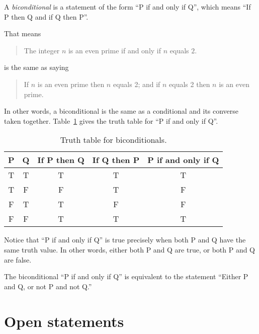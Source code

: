 \documentclass{tufte-book}
\begin{document}
\begin{definition}
  A \emph{biconditional} is a statement of the form ``P if and only if Q'', which means ``If P then Q and if Q then P''.
\end{definition}

That means
\begin{quote}
  The integer $n$ is an even prime if and only if $n$ equals $2$.
\end{quote}
is the same as saying
\begin{quote}
  If $n$ is an even prime then $n$ equals 2; and if $n$ equals 2 then $n$ is an even prime.
\end{quote}
In other words, a biconditional is the same as a conditional and its converse taken together. Table~\ref{tab:truth-table-iff} gives the truth table for ``P if and only if Q''.

\begin{table}
  \centering
  \begin{tabular}{ccccc}
    \toprule
    P & Q & If P then Q & If Q then P & P if and only if Q \\ \midrule
    T & T & T & T & T\\
    T & F & F & T & F\\
    F & T & T & F & F\\
    F & F & T & T & T\\ \bottomrule
  \end{tabular}
  \caption{Truth table for biconditionals.}
  \label{tab:truth-table-iff}
\end{table}

Notice that ``P if and only if Q'' is true precisely when both P and Q have the same truth value. In other words, either both P and Q are true, or both P and Q are false.

\begin{proposition}\label{prop:biconditional-equiv-or}
  The biconditional ``P if and only if Q'' is equivalent to the statement ``Either P and Q, or not P and not Q.''
\end{proposition}


\section{Open statements}
\label{sec:open-statements}
\end{document}
